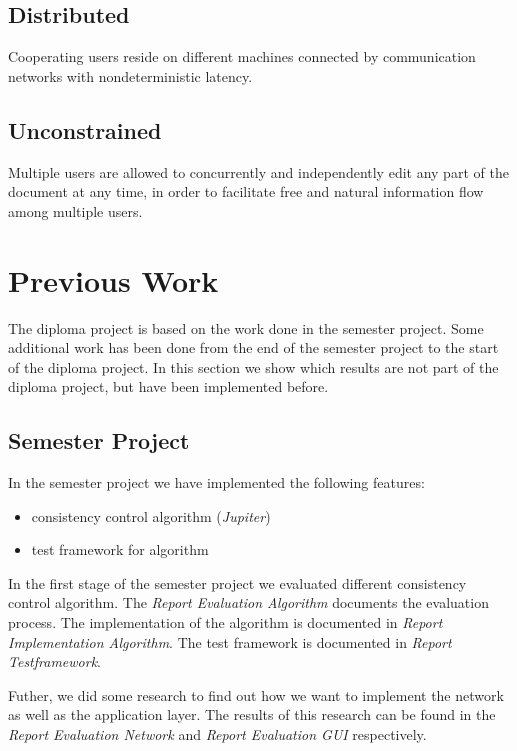 \subsection{Distributed} 
Cooperating users reside on different machines 
connected by communication networks with nondeterministic latency.

\subsection{Unconstrained} 
Multiple users are allowed to concurrently and
independently edit any part of the document at any time, in order to 
facilitate free and natural information flow among multiple users.



\section{Previous Work}
\label{sect:overview.previouswork}

The diploma project is based on the work done in the semester project. Some
additional work has been done from the end of the semester
project to the start of the diploma project. In this section we show which
results are not part of the diploma project, but have been implemented
before.

\subsection{Semester Project}
In the semester project we have implemented the following features:
\begin{itemize}
 \item consistency control algorithm (\emph{Jupiter})
 \item test framework for algorithm
\end{itemize}

In the first stage of the semester project we evaluated different
consistency control algorithm. The \emph{Report Evaluation Algorithm}
documents the evaluation process. The implementation of the
algorithm is documented in \emph{Report Implementation Algorithm}. The
test framework is documented in \emph{Report Testframework}.

Futher, we did some research to find out how we want to implement the
network as well as the application layer. The results of this research
can be found in the \emph{Report Evaluation Network} and 
\emph{Report Evaluation GUI} respectively.


